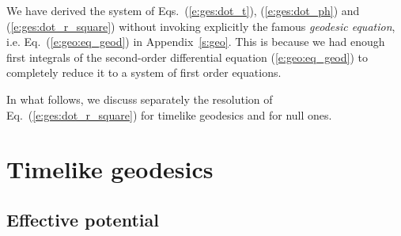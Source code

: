 \begin{remark}
We have derived the system of Eqs.~(\ref{e:ges:dot_t}), (\ref{e:ges:dot_ph}) and (\ref{e:ges:dot_r_square}) without invoking explicitly the
famous \emph{geodesic equation}, i.e.
Eq.~(\ref{e:geo:eq_geod}) in Appendix~\ref{s:geo}.
This is because we had enough
first integrals of the second-order differential equation
(\ref{e:geo:eq_geod})
to completely reduce it to
a system of first order equations.
\end{remark}

In what follows, we discuss separately the resolution of
Eq.~(\ref{e:ges:dot_r_square}) for timelike geodesics and for null ones.


\section{Timelike geodesics}

\subsection{Effective potential} \label{s:ges:eff_pot_timelike}

